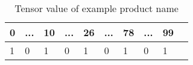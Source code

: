 \begin{table}[htp!]
    \centering
    \caption{Tensor value of example product name}
    \label{table:tensorvalue}
    \begin{tabular}{ llllllllll }
          \toprule
          
          \textbf{0} & \textbf{...}& \textbf{10}&\textbf{...}&\textbf{26}&\textbf{...}&\textbf{78}&\textbf{...}&\textbf{99}\\
          \midrule
          1 & 0& 1& 0&1& 0& 1 & 0& 1\\
                 
        
          \bottomrule
          \end{tabular}
\end{table}




